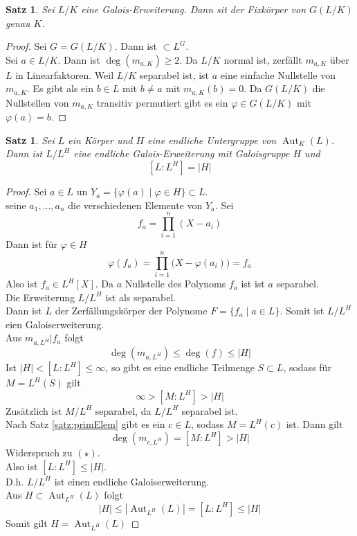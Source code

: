\documentclass[10pt,a4paper]{article}
\newcommand{\abs}[1]{\left|#1\right|}
\newcommand{\Aut}{\operatorname{Aut}}
\theoremstyle{plain}
\newtheorem{satz}[theorem]{Satz}
\theoremstyle{definition}
\theoremstyle{remark}
\begin{document}
	\begin{satz}
		Sei $L/K$ eine Galois-Erweiterung. Dann sit der Fixkörper von $G(L/K)$ genau $K$.
	\end{satz}
	\begin{proof}
		Sei $G=G(L/K)$. Dann ist $\subset L^G$.\\
		Sei $a\in L/K$. Dann ist $\deg(m_{a,K})\geq 2$. Da $L/K$ normal ist, zerfällt $m_{a,K}$ über $L$ in Linearfaktoren. Weil $L/K$ separabel ist, ist $a$ eine einfache Nullstelle von $m_{a,K}$. Es gibt als ein $b\in L$ mit $b\neq a$ mit $m_{a,K}(b)=0$. Da $G(L/K)$ die Nullstellen von $m_{a,K}$ transitiv permutiert gibt es ein $\varphi\in G(L/K)$ mit $\varphi(a)=b$.
	\end{proof}

	\begin{satz}
		Sei $L$ ein Körper und $H$ eine endliche Untergruppe von $\Aut_K(L)$. Dann ist $L/L^H$ eine endliche Galois-Erweiterung mit Galoisgruppe $H$ und
		\[[L:L^H]=\abs{H}\]
	\end{satz}
	\begin{proof}
		Sei $a\in L$ un $Y_a=\{\varphi(a)\mid\varphi\in H\}\subset L$.\\
		seine $a_1,...,a_n$ die verschiedenen Elemente von $Y_a$. Sei
		\[f_a=\prod_{i=1}^{n}(X-a_i)\]
		Dann ist für $\varphi\in H$ 
		\[\varphi(f_a)=\prod_{i=1}^{n}\big(X-\varphi(a_i)\big)=f_a\]
		Also ist $f_a\in L^H[X]$. Da $a$ Nullstelle des Polynoms $f_a$ ist ist $a$ separabel.\\
		Die Erweiterung $L/L^H$ ist als separabel.\\
		Dann ist $L$ der Zerfällungskörper der Polynome $F=\{f_a\mid a\in L\}$. Somit ist $L/L^H$ eien Galoiserweiterung.\\
		Aus $m_{a,L^H}| f_a$ folgt 
		\[\deg(m_{a,L^H})\leq \deg(f)\leq \abs{H}\tag{$\star$}\]
		Ist $\abs{H}<[L:L^H]\leq\infty$, so gibt es eine endliche Teilmenge $S\subset L$, sodass für $M=L^H(S)$ gilt
		\[\infty>[M:L^H]>\abs H\]
		Zusätzlich ist $M/L^H$ separabel, da $L/L^H$ separabel ist.\\
		Nach Satz \ref{satz:primElem} gibt es ein $c\in L$, sodass $M=L^H(c)$ ist. Dann gilt
		\[\deg(m_{c,L^H})=[M:L^H]>\abs{H}\]
		Widerspruch zu $(\star)$.\\
		Also ist $[L:L^H]\leq\abs H$.\\
		D.h. $L/L^H$ ist einen endliche Galoiserweiterung.\\
		Aus $H\subset \Aut_{L^H}(L)$ folgt
		\[\abs H\leq\abs{\Aut_{L^H}(L)}=[L:L^H]\leq\abs{H}\]
		Somit gilt $H=\Aut_{L^H}(L)$
	\end{proof}
\end{document}
